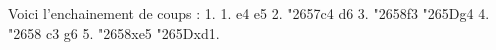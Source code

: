 \documentclass{article}
\newcommand\bB{{\chessfont \char"265D}} %
\newcommand\wN{{\chessfont \char"2658}} %
\newcommand\wB{{\chessfont \char"2657}} %
\begin{document}
Voici l’enchainement de coups : 1. 1. e4 e5 2. \wB c4 d6 3. \wN f3 \bB g4 4. \wN
c3 g6 5. \wN xe5 \bB xd1.
\end{document}
